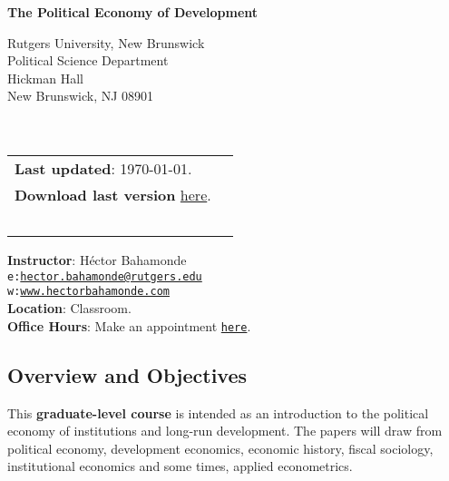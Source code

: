 \documentclass[letterpaper]{article}
\def\name{The Political Economy of Development}
\begin{document}

\centerline{\huge \bf \name}

\vspace{0.25in}

\begin{minipage}{0.45\linewidth}
  Rutgers University, New Brunswick \\
  Political Science Department \\
  Hickman Hall \\
  New Brunswick, NJ 08901\\
  \\
  \\

\end{minipage}
\hspace{4cm}\begin{minipage}{0.45\linewidth}
  \begin{tabular}{ll}
{\bf Last updated}: \today. \\
 {\bf Download last version} \href{http://github.com/hbahamonde/Job_Market/raw/master/Bahamonde_CV.pdf}{here}.
    \\
    \\
    \\
    \\
    \\
    \\
  \end{tabular}
\end{minipage}

\vspace{-5mm}
{\bf Instructor}: H\'ector Bahamonde\\
\texttt{e:}\href{mailto:hector.bahamonde@rutgers.edu}{\texttt{hector.bahamonde@rutgers.edu}}\\
\texttt{w:}\href{http://www.hectorbahamonde.com}{\texttt{www.hectorbahamonde.com}}\\
{\bf Location}: Classroom.\\
{\bf Office Hours}: Make an appointment \href{https://calendly.com/bahamonde/officehours}{\texttt{here}}.

\subsection*{Overview and Objectives}

This {\bf {\color{blue}graduate-level course}} is intended as an introduction to the political economy of institutions and long-run development. The papers will draw from political economy, development economics, economic history, fiscal sociology, institutional economics and some times, applied econometrics. 
\end{document}
